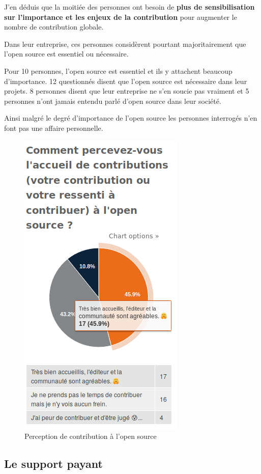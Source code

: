 			J'en déduis que la moitiée des personnes ont besoin de \textbf{plus de sensibilisation sur l'importance et les enjeux de la contribution} pour augmenter le nombre de contribution globale.

			Dans leur entreprise, ces personnes considèrent pourtant majoritairement que l'open source est essentiel ou nécessaire.

			Pour 10 personnes, l'open source est essentiel et ils y attachent beaucoup d'importance.
			12 questionnés disent que l'open source est nécessaire dans leur projets. 8 personnes disent que leur entreprise ne s'en soucie pas vraiment et 5 personnes n'ont jamais entendu parlé d'open source dans leur société.

			Ainsi malgré le degré d'importance de l'open source les personnes interrogés n'en font pas une affaire personnelle.

			\begin{figure}[ht]
				\center
				\includegraphics[scale=0.58]{./img/a7}
				\caption{Perception de contribution à l'open source}					
			\end{figure}

			\subsection{Le support payant}

